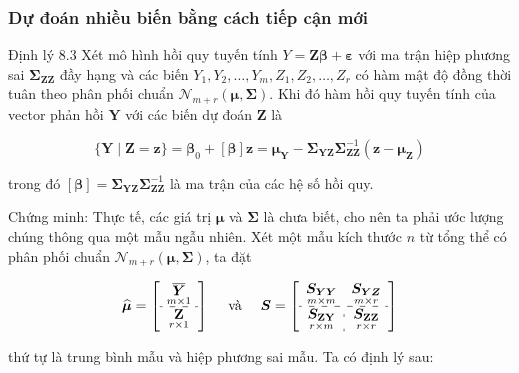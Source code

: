 \begin{frame}
\frametitle{ Dự đoán nhiều biến bằng cách tiếp cận mới}
\begin{block}{Định lý 8.3}
Xét mô hình hồi quy tuyến tính $Y=\boldsymbol{Z} \boldsymbol{\beta}+\boldsymbol{\varepsilon}$ với ma trận hiệp phương sai $\boldsymbol{\Sigma}_{\boldsymbol{Z Z}}$ đầy hạng và các biến $Y_1, Y_2, \ldots, Y_m, Z_1, Z_2, \ldots, Z_r$ có hàm mật độ đồng thời tuân theo phân phối chuẩn $\mathcal{N}_{m+r}(\boldsymbol{\mu}, \boldsymbol{\Sigma})$.
Khi đó hàm hồi quy tuyến tính của vector phản hồi $\boldsymbol{Y}$ với các biến dự đoán $\boldsymbol{Z}$ là

$$
\{\boldsymbol{Y} \mid \boldsymbol{Z}=\boldsymbol{z}\}=\boldsymbol{\beta}_0+[\boldsymbol{\beta}] \boldsymbol{z}=\boldsymbol{\mu}_{\boldsymbol{Y}}-\boldsymbol{\Sigma}_{\boldsymbol{Y} \boldsymbol{Z}} \boldsymbol{\Sigma}_{\boldsymbol{Z} \boldsymbol{Z}}^{-1}\left(\boldsymbol{z}-\boldsymbol{\mu}_{\boldsymbol{Z}}\right)
$$

trong đó $[\boldsymbol{\beta}]=\boldsymbol{\Sigma}_{\boldsymbol{Y} \boldsymbol{Z}} \boldsymbol{\Sigma}_{\boldsymbol{Z} \boldsymbol{Z}}^{-1}$ là ma trận của các hệ số hồi quy.
\end{block}

Chứng minh: Thực tế, các giá trị $\boldsymbol{\mu}$ và $\boldsymbol{\Sigma}$ là chưa biết, cho nên ta phải ước lượng chúng thông qua một mẫu ngẫu nhiên.
Xét một mẫu kích thước $n$ từ tổng thể có phân phối chuẩn $\mathcal{N}_{m+r}(\boldsymbol{\mu}, \boldsymbol{\Sigma})$, ta đặt

$$
\widehat{\boldsymbol{\mu}}=\left[\begin{array}{c}
 \underset{m \times 1}{\overline{\boldsymbol{Y}}} \\
\hdashline \underset{r \times 1}{\mathbf{Z}} \\
\end{array}\right] \quad \text { và } \quad \boldsymbol{S}=\left[\begin{array}{c:c}
\underset{m \times m}{\boldsymbol{S}_{\boldsymbol{Y} \boldsymbol{Y}}} & \underset{m \times r}{\boldsymbol{S}_{\boldsymbol{Y} \boldsymbol{Z}}} \\
\hdashline \underset{r \times m}{\boldsymbol{S}_{\mathbf{Z Y}}} & \underset{r \times r}{\boldsymbol{S}_{\mathbf{Z Z}}}
\end{array}\right]
$$

thứ tự là trung bình mẫu và hiệp phương sai mẫu.
Ta có định lý sau:

\end{frame}

